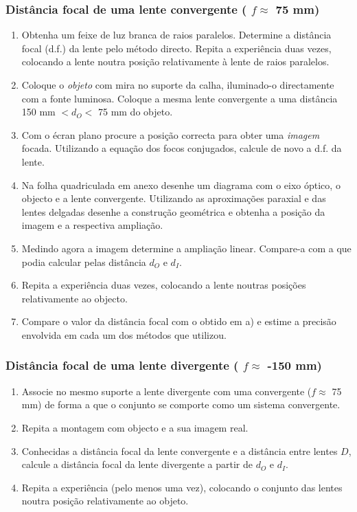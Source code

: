 \documentclass[a4paper,12pt]{article}      %
\begin{document}
\subsubsection{\sf   Distância focal de uma lente convergente ( $f  \approx$ 75 mm) }
 
\begin{enumerate}
\item Obtenha  um  feixe  de  luz  branca  de  raios  paralelos.
Determine  a  distância  focal (d.f.)  da  lente pelo método directo.  Repita  a  experiência  duas  vezes,  colocando  a  lente 
noutra posição relativamente à lente de raios paralelos. 
\item Coloque o \emph{objeto} com mira no suporte da calha, iluminado-o directamente com a fonte luminosa. Coloque a mesma lente convergente a uma distância 150 mm $< d_O <$ 75 mm do objeto.

\item Com o écran plano procure a posição correcta para obter uma \emph{imagem} focada.
Utilizando a equação dos focos conjugados, calcule de novo a d.f. da lente. 
\item Na folha quadriculada em anexo desenhe um diagrama com o eixo óptico, o objecto e a lente convergente. Utilizando as aproximações paraxial e das lentes delgadas desenhe a construção geométrica e obtenha a posição da imagem e a respectiva ampliação.

\item Medindo agora a imagem determine a ampliação linear. Compare-a com a que podia  calcular pelas distância $d_O$  e $d_I$. 
\item Repita a experiência duas vezes, colocando a lente noutras posições relativamente ao objecto.  
\item Compare o valor da distância focal com o obtido em a) e estime a precisão envolvida em 
cada um dos métodos que utilizou. 
\end{enumerate}

\subsubsection{\sf   Distância focal de uma lente divergente ( $f  \approx$ -150 mm) }
\begin{enumerate}
\item Associe  no  mesmo  suporte  a  lente  divergente  com  uma  convergente ($f  \approx$ 75 mm) de  forma a  que  o 
conjunto se comporte como um sistema convergente.
\item Repita a montagem com objecto e a sua imagem real. 
\item Conhecidas  a  distância  focal  da  lente  convergente  e  a  distância  entre  lentes $D$, calcule  a 
distância focal da lente divergente a partir de $d_O$  e $d_I$. 
\item Repita a experiência (pelo menos uma vez), colocando o conjunto das lentes noutra posição 
relativamente ao objeto. 


\end{enumerate}
	
\end{document}
